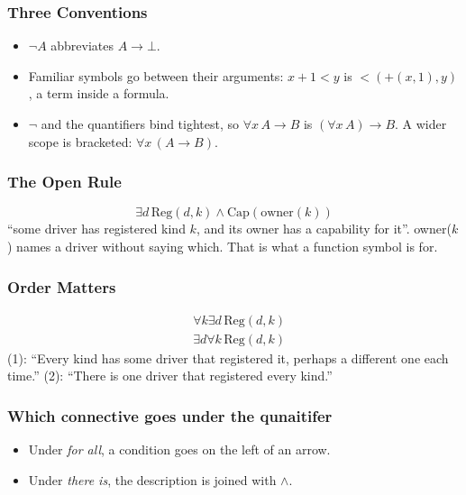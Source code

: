 \documentclass[a4paper, 11pt]{article}
\theoremstyle{definition}
\begin{document}
\subsubsection{Three Conventions}
    \begin{itemize}
        \item $\neg A$ abbreviates $A \to \bot$.
        \item Familiar symbols go between their arguments: $x+1 < y$ is $<(+(x, 1), y)$, a term inside a formula.
        \item $\neg$ and the quantifiers bind tightest, so $\forall x \, A \to B$ is $(\forall x \, A) \to B$. A wider
        scope is bracketed: $\forall x \, (A \to B)$.
    \end{itemize}

\subsubsection{The Open Rule}
\[\exists d  \, \text{Reg}(d, k) \land \text{Cap}(\text{owner}(k))\]
``some driver has registered kind $k$, and its owner has a capability for it''. owner($k$) names a driver without saying
which. That is what a function symbol is for.

\subsubsection{Order Matters}
\begin{align}
    &\forall k \exists d \, \text{Reg}(d, k) \\
    &\exists d \forall k \, \text{Reg}(d, k)
\end{align}
(1): ``Every kind has some driver that registered it, perhaps a different one each time.''
(2): ``There is one driver that registered every kind.''

\subsubsection{Which connective goes under the qunaitifer}
\begin{itemize}
    \item Under \textit{for all}, a condition goes on the left of an arrow.
    \item Under \textit{there is}, the description is joined with $\land$.
\end{itemize}
\end{document}
